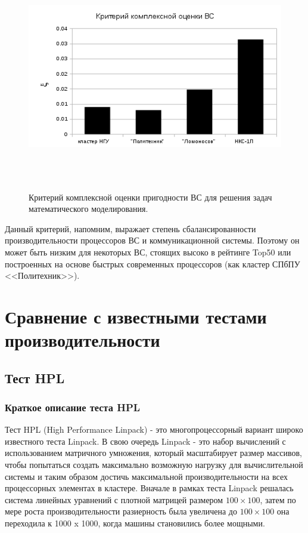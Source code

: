 \begin{figure}[htb]
	\begin{center}
		\includegraphics[height=10cm,keepaspectratio]{images/modern_PIC_params_xi_new.png}
	\end{center}
	\caption{Критерий комплексной оценки пригодности ВС для решения задач математического моделирования.}
	\label{xi}
\end{figure} 
Данный критерий, напомним, выражает степень сбалансированности производительности процессоров ВС и коммуникационной системы. Поэтому он может быть низким для некоторых ВС, стоящих высоко в рейтинге Top50 или построенных на основе быстрых современных процессоров (как кластер СПбПУ <<Политехник>>).




\section{Сравнение с известными тестами производительности}

\subsection{Тест HPL}

\subsubsection{Краткое описание теста HPL}
Тест HPL (High Performance Linpack) - это многопроцессорный вариант широко известного теста Linpack. В свою очередь Linpack - это набор вычислений с использованием матричного умножения, который масштабирует размер массивов, чтобы попытаться создать максимально возможную нагрузку для вычислительной системы и таким образом достичь максимальной производительности на всех процессорных элементах в кластере. Вначале в рамках теста Linpack решалась система линейных уравнений с плотной матрицей размером $ 100 \times 100$, затем по мере роста производительности разиерность была увеличена до $ 100 \times 100$ она переходила к 1000 x 1000, когда машины становились более мощными.

